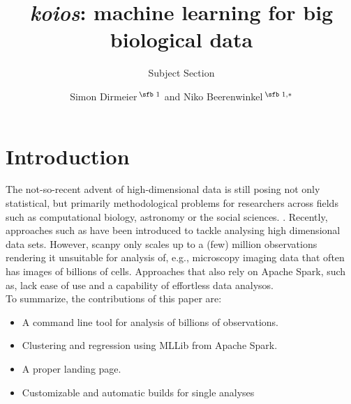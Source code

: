 \documentclass{bioinfo}
\begin{document}

\subtitle{Subject Section}

\title[short Title]{\textit{koios}: machine learning for big biological data}
\author[Sample \textit{et~al}.]{Simon Dirmeier\,$^{\text{\sfb 1}}$ and Niko Beerenwinkel\,$^{\text{\sfb 1,}*}$}
\address{$^{\text{\sf 1}}$Department, Institution, City, Post Code, Switzerland}





\maketitle

\section{Introduction}

The not-so-recent advent of high-dimensional data is still posing not only statistical, but primarily methodological problems for researchers across fields such as computational biology, astronomy or the social sciences. \citep{a reference}.
Recently, approaches such as \citep{SCANPY} have been introduced to tackle analysing high dimensional data sets. However, scanpy only scales up to a (few) million observations rendering it unsuitable for analysis of, e.g., microscopy imaging data that often has images of billions of cells. Approaches that also rely on Apache Spark, such as, \citep{biospark} lack ease of use and a capability of effortless data analysos.\\
To summarize, the contributions of this paper are:
\begin{itemize}
	\item A command line tool for analysis of billions of observations.
	\item Clustering and regression using MLLib from Apache Spark.
	\item A proper landing page.
	\item Customizable and automatic builds for single analyses
\end{itemize}
\end{document}
